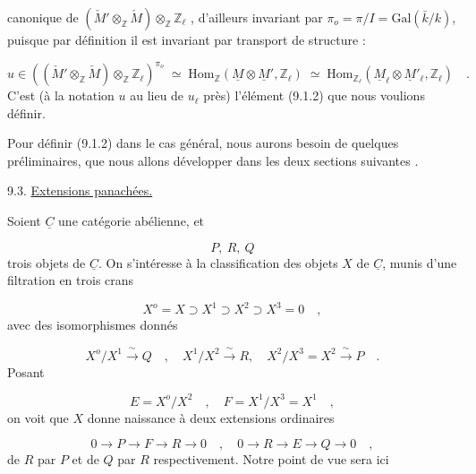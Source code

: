
canonique de $(\check{M}'\otimes_{\mathbb{Z}}\check{M})\otimes_{\mathbb{Z}}\mathbb{Z}_\ell$ , d'ailleurs invariant par $\pi_o=\pi/I=\mathrm{Gal}(\bar{k}/k)$, puisque par définition il est invariant par transport de structure :

\begin{equation}\tag{9.2.9}
u \in ((\check{M}'\otimes_{\mathbb{Z}}\check{M})\otimes_{\mathbb{Z}}\mathbb{Z}_\ell)^{\pi_o} \;\simeq\; \mathrm{Hom}_{\mathbb{Z}}(\underline{M}\otimes\underline{M}',\mathbb{Z}_\ell) \;\simeq\; \mathrm{Hom}_{\mathbb{Z}_\ell}(\underline{M}_\ell\otimes\underline{M}'_\ell,\mathbb{Z}_\ell) \quad .
\end{equation}
C'est (à la notation $u$ au lieu de $u_\ell$ près) l'élément (9.1.2) que nous voulions définir.

Pour définir (9.1.2) dans le cas général, nous aurons besoin de quelques préliminaires, que nous allons développer dans les deux sections suivantes .


9.3. \underline{Extensions panachées.}

Soient $\underline{C}$ une catégorie abélienne, et

\begin{equation}\tag{9.3.1}
P,\ R,\ Q
\end{equation}
trois objets de $\underline{C}$. On s'intéresse à la classification des objets $X$ de $\underline{C}$, munis d'une filtration en trois crans

\begin{equation}\tag{*}
X^o = X \supset X^1 \supset X^2 \supset X^3 = 0 \quad ,
\end{equation}
avec des isomorphismes donnés

\begin{equation*}
X^o/X^1 \xrightarrow{\ \sim\ } Q \quad , \quad X^1/X^2 \xrightarrow{\ \sim\ } R, \quad X^2/X^3 = X^2 \xrightarrow{\ \sim\ } P \quad .
\end{equation*}
Posant

\begin{equation*}
E = X^o/X^2 \quad , \quad F = X^1/X^3 = X^1 \quad ,
\end{equation*}
on voit que $X$ donne naissance à deux extensions ordinaires

\begin{equation}\tag{9.3.2}
0 \longrightarrow P \longrightarrow F \longrightarrow R \longrightarrow 0 \quad , \quad 0 \longrightarrow R \longrightarrow E \longrightarrow Q \longrightarrow 0 \quad ,
\end{equation}
de $R$ par $P$ et de $Q$ par $R$ respectivement. Notre point de vue sera ici


